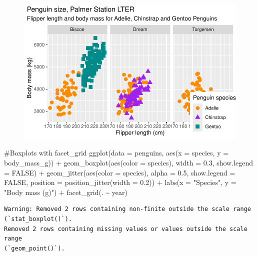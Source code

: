 \documentclass[
  letterpaper,
  DIV=11,
  numbers=noendperiod]{scrreprt}
\newenvironment{Shaded}{\begin{snugshade}}{\end{snugshade}}
\newcommand{\AttributeTok}[1]{\textcolor[rgb]{0.40,0.45,0.13}{#1}}
\newcommand{\CommentTok}[1]{\textcolor[rgb]{0.37,0.37,0.37}{#1}}
\newcommand{\ConstantTok}[1]{\textcolor[rgb]{0.56,0.35,0.01}{#1}}
\newcommand{\FloatTok}[1]{\textcolor[rgb]{0.68,0.00,0.00}{#1}}
\newcommand{\FunctionTok}[1]{\textcolor[rgb]{0.28,0.35,0.67}{#1}}
\newcommand{\NormalTok}[1]{\textcolor[rgb]{0.00,0.23,0.31}{#1}}
\newcommand{\SpecialCharTok}[1]{\textcolor[rgb]{0.37,0.37,0.37}{#1}}
\newcommand{\StringTok}[1]{\textcolor[rgb]{0.13,0.47,0.30}{#1}}
\begin{document}
\begin{figure}[H]

{\centering \includegraphics{scripts/02_dataViz/class4_files/figure-pdf/facet_grid-1.pdf}

}

\end{figure}

\begin{Shaded}
\begin{Highlighting}[]
\CommentTok{\#Boxplots with facet\_grid}
\FunctionTok{ggplot}\NormalTok{(}\AttributeTok{data =}\NormalTok{ penguins, }\FunctionTok{aes}\NormalTok{(}\AttributeTok{x =}\NormalTok{ species, }\AttributeTok{y =}\NormalTok{ body\_mass\_g)) }\SpecialCharTok{+}
  \FunctionTok{geom\_boxplot}\NormalTok{(}\FunctionTok{aes}\NormalTok{(}\AttributeTok{color =}\NormalTok{ species), }\AttributeTok{width =} \FloatTok{0.3}\NormalTok{, }\AttributeTok{show.legend =} \ConstantTok{FALSE}\NormalTok{) }\SpecialCharTok{+}
  \FunctionTok{geom\_jitter}\NormalTok{(}\FunctionTok{aes}\NormalTok{(}\AttributeTok{color =}\NormalTok{ species), }\AttributeTok{alpha =} \FloatTok{0.5}\NormalTok{, }\AttributeTok{show.legend =} \ConstantTok{FALSE}\NormalTok{, }\AttributeTok{position =} \FunctionTok{position\_jitter}\NormalTok{(}\AttributeTok{width =} \FloatTok{0.2}\NormalTok{)) }\SpecialCharTok{+}
  \FunctionTok{labs}\NormalTok{(}\AttributeTok{x =} \StringTok{"Species"}\NormalTok{,}
       \AttributeTok{y =} \StringTok{"Body mass (g)"}\NormalTok{) }\SpecialCharTok{+}
  \FunctionTok{facet\_grid}\NormalTok{(. }\SpecialCharTok{\textasciitilde{}}\NormalTok{ year) }
\end{Highlighting}
\end{Shaded}

\begin{verbatim}
Warning: Removed 2 rows containing non-finite outside the scale range
(`stat_boxplot()`).
Removed 2 rows containing missing values or values outside the scale range
(`geom_point()`).
\end{verbatim}
\end{document}
